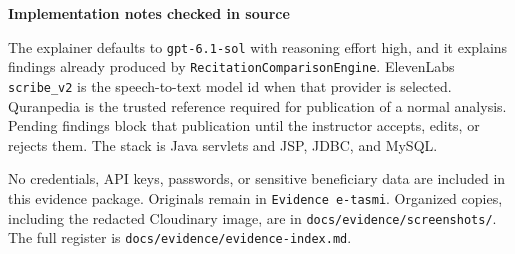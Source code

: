 \documentclass[10.5pt]{article}
\newcommand{\evbox}[1]{%
  \vspace{0.6mm}\noindent\colorbox{tealsoft}{%
    \begin{minipage}{\dimexpr\textwidth-2\fboxsep\relax}
      \fontsize{9.5}{12.4}\selectfont #1
    \end{minipage}}\par\vspace{0.8mm}%
}
\newcommand{\hlabel}[1]{{\sffamily\bfseries\color{navy}#1}}
\begin{document}
\vspace{1.6mm}
\hlabel{Implementation notes checked in source}\par
The explainer defaults to \texttt{gpt-6.1-sol} with reasoning effort high, and it explains findings already produced by \texttt{RecitationComparisonEngine}. ElevenLabs \texttt{scribe\_v2} is the speech-to-text model id when that provider is selected. Quranpedia is the trusted reference required for publication of a normal analysis. Pending findings block that publication until the instructor accepts, edits, or rejects them. The stack is Java servlets and JSP, JDBC, and MySQL.

\vspace{1.2mm}
\evbox{No credentials, API keys, passwords, or sensitive beneficiary data are included in this evidence package. Originals remain in \texttt{Evidence e-tasmi}. Organized copies, including the redacted Cloudinary image, are in \texttt{docs/evidence/screenshots/}. The full register is \texttt{docs/evidence/evidence-index.md}.}
\end{document}
